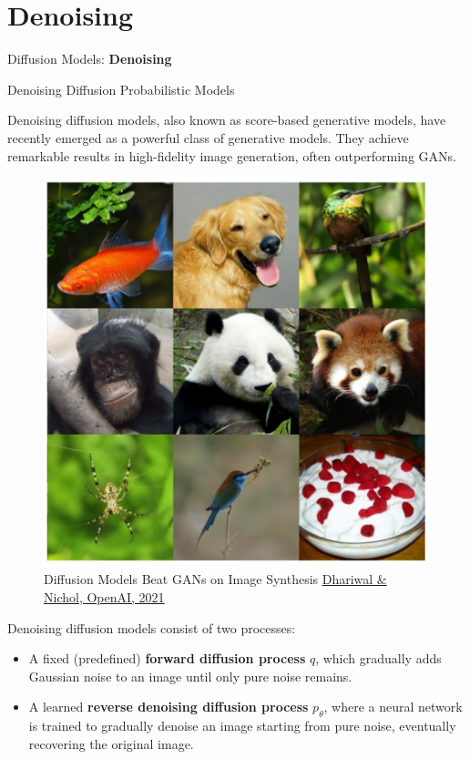 \section{Denoising}
\begin{frame}{}
    \LARGE Diffusion Models: \textbf{Denoising}
\end{frame}

\begin{frame}[allowframebreaks]{Denoising Diffusion Probabilistic Models}
    
Denoising diffusion models, also known as score-based generative models, have recently emerged as a powerful class of generative models. They achieve remarkable results in high-fidelity image generation, often outperforming GANs.
\begin{figure}
    \centering
    \includegraphics[height=0.5\textheight, width=\textwidth, keepaspectratio]{images/diffusion/diff_results_1.png}
    \caption*{Diffusion Models Beat GANs on Image Synthesis \href{https://arxiv.org/abs/2105.05233}{Dhariwal \& Nichol, OpenAI, 2021}}
\end{figure}

\framebreak
Denoising diffusion models consist of two processes:
\begin{itemize}
    \item A fixed (predefined) \textbf{forward diffusion process} $q$, which gradually adds Gaussian noise to an image until only pure noise remains.
    \item A learned \textbf{reverse denoising diffusion process} $p_\theta$, where a neural network is trained to gradually denoise an image starting from pure noise, eventually recovering the original image.
\end{itemize}


\end{frame}
